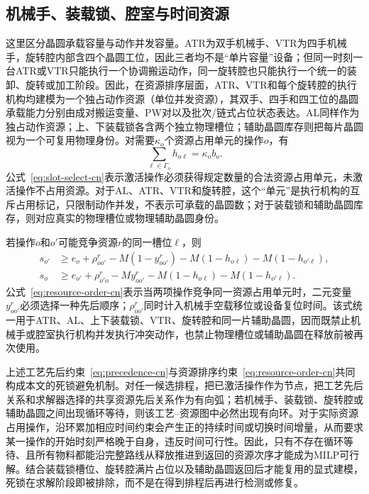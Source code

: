 \documentclass[final,5p,times,twocolumn]{elsarticle}
\begin{document}
\subsection{机械手、装载锁、腔室与时间资源}

这里区分晶圆承载容量与动作并发容量。ATR为双手机械手、VTR为四手机械手，旋转腔内部含四个晶圆工位，因此三者均不是“单片容量”设备；但同一时刻一台ATR或VTR只能执行一个协调搬运动作，同一旋转腔也只能执行一个统一的装卸、旋转或加工阶段。因此，在资源排序层面，ATR、VTR和每个旋转腔的执行机构均建模为一个独占动作资源（单位并发资源），其双手、四手和四工位的晶圆承载能力分别由成对搬运变量、PW对以及批次/链式占位状态表达。AL同样作为独占动作资源；上、下装载锁各含两个独立物理槽位；辅助晶圆库存则把每片晶圆视为一个可复用物理身份。对需要$\kappa_o$个资源占用单元的操作$o$，有
\begin{equation}
\sum_{\ell\in\Gamma_o}h_{o\ell}=\kappa_ob_o.
\label{eq:slot-select-cn}
\end{equation}
公式~\eqref{eq:slot-select-cn}表示激活操作必须获得规定数量的合法资源占用单元，未激活操作不占用资源。对于AL、ATR、VTR和旋转腔，这个“单元”是执行机构的互斥占用标记，只限制动作并发，不表示可承载的晶圆数；对于装载锁和辅助晶圆库存，则对应真实的物理槽位或物理辅助晶圆身份。

若操作$o$和$o'$可能竞争资源$r$的同一槽位$\ell$，则
\begin{equation}
\begin{aligned}
s_{o'}&\ge e_o+\rho^r_{oo'}-M(1-y^r_{oo'})
-M(1-h_{o\ell})-M(1-h_{o'\ell}),\\
s_o&\ge e_{o'}+\rho^r_{o'o}-My^r_{oo'}
-M(1-h_{o\ell})-M(1-h_{o'\ell}).
\end{aligned}
\label{eq:resource-order-cn}
\end{equation}
公式~\eqref{eq:resource-order-cn}表示当两项操作竞争同一资源占用单元时，二元变量$y^r_{oo'}$必须选择一种先后顺序；$\rho^r_{oo'}$同时计入机械手空载移位或设备复位时间。该式统一用于ATR、AL、上下装载锁、VTR、旋转腔和同一片辅助晶圆，因而既禁止机械手或腔室执行机构并发执行冲突动作，也禁止物理槽位或辅助晶圆在释放前被再次使用。

上述工艺先后约束~\eqref{eq:precedence-cn}与资源排序约束~\eqref{eq:resource-order-cn}共同构成本文的死锁避免机制。对任一候选排程，把已激活操作作为节点，把工艺先后关系和求解器选择的共享资源先后关系作为有向弧；若机械手、装载锁、旋转腔或辅助晶圆之间出现循环等待，则该工艺--资源图中必然出现有向环。对于实际资源占用操作，沿环累加相应时间约束会产生正的持续时间或切换时间增量，从而要求某一操作的开始时刻严格晚于自身，违反时间可行性。因此，只有不存在循环等待、且所有物料都能沿完整路线从释放推进到返回的资源次序才能成为MILP可行解。结合装载锁槽位、旋转腔满片占位以及辅助晶圆返回后才能复用的显式建模，死锁在求解阶段即被排除，而不是在得到排程后再进行检测或修复。
\end{document}
